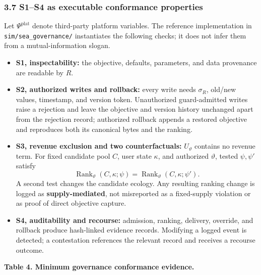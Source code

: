 \documentclass[
  11pt]{article}
\providecommand{\tightlist}{%
  \setlength{\itemsep}{0pt}\setlength{\parskip}{0pt}}
\begin{document}
\subsubsection{3.7 S1--S4 as executable conformance
properties}\label{s1s4-as-executable-conformance-properties}

Let \(\Psi^{\mathrm{plat}}\) denote third-party platform variables. The
reference implementation in \texttt{sim/sea\_governance/} instantiates
the following checks; it does not infer them from a mutual-information
slogan.

\begin{itemize}
\tightlist
\item
  \textbf{S1, inspectability:} the objective, defaults, parameters, and
  data provenance are readable by \(R\).
\item
  \textbf{S2, authorized writes and rollback:} every write needs
  \(\sigma_R\), old/new values, timestamp, and version token.
  Unauthorized guard-admitted writes raise a rejection and leave the
  objective and version history unchanged apart from the rejection
  record; authorized rollback appends a restored objective and
  reproduces both its canonical bytes and the ranking.
\item
  \textbf{S3, revenue exclusion and two counterfactuals:}
  \(U_\vartheta\) contains no revenue term. For fixed candidate pool
  \(C\), user state \(\kappa\), and authorized \(\vartheta\), tested
  \(\psi,\psi'\) satisfy
  \[\operatorname{Rank}_\vartheta(C,\kappa;\psi)=\operatorname{Rank}_\vartheta(C,\kappa;\psi').\]
  A second test changes the candidate ecology. Any resulting ranking
  change is logged as \textbf{supply-mediated}, not misreported as a
  fixed-supply violation or as proof of direct objective capture.
\item
  \textbf{S4, auditability and recourse:} admission, ranking, delivery,
  override, and rollback produce hash-linked evidence records. Modifying
  a logged event is detected; a contestation references the relevant
  record and receives a recourse outcome.
\end{itemize}

\textbf{Table 4. Minimum governance conformance evidence.}
\end{document}
